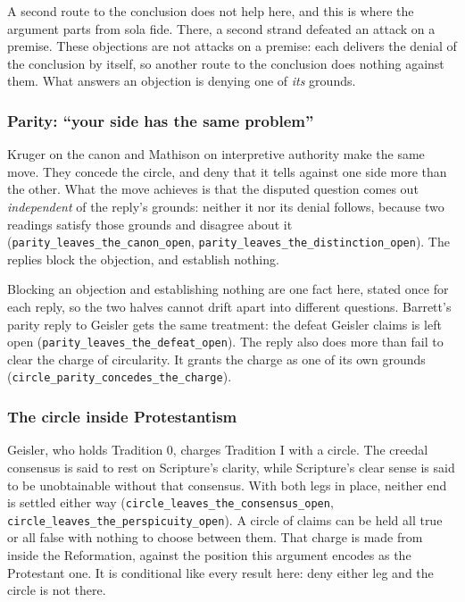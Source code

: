 \documentclass[11pt]{article}
\begin{document}
A second route to the conclusion does not help here, and this is where the argument parts from sola fide. There, a second strand defeated an attack on a premise. These objections are not attacks on a premise: each delivers the denial of the conclusion by itself, so another route to the conclusion does nothing against them. What answers an objection is denying one of \emph{its} grounds.

\subsubsection*{Parity: “your side has the same problem”}
Kruger on the canon and Mathison on interpretive authority make the same move. They concede the circle, and deny that it tells against one side more than the other. What the move achieves is that the disputed question comes out \emph{independent} of the reply’s grounds: neither it nor its denial follows, because two readings satisfy those grounds and disagree about it (\texttt{parity\_\allowbreak{}leaves\_\allowbreak{}the\_\allowbreak{}canon\_\allowbreak{}open}, \texttt{parity\_\allowbreak{}leaves\_\allowbreak{}the\_\allowbreak{}distinction\_\allowbreak{}open}). The replies block the objection, and establish nothing.

Blocking an objection and establishing nothing are one fact here, stated once for each reply, so the two halves cannot drift apart into different questions. Barrett’s parity reply to Geisler gets the same treatment: the defeat Geisler claims is left open (\texttt{parity\_\allowbreak{}leaves\_\allowbreak{}the\_\allowbreak{}defeat\_\allowbreak{}open}). The reply also does more than fail to clear the charge of circularity. It grants the charge as one of its own grounds (\texttt{circle\_\allowbreak{}parity\_\allowbreak{}concedes\_\allowbreak{}the\_\allowbreak{}charge}).

\subsubsection*{The circle inside Protestantism}
Geisler, who holds Tradition 0, charges Tradition I with a circle. The creedal consensus is said to rest on Scripture’s clarity, while Scripture’s clear sense is said to be unobtainable without that consensus. With both legs in place, neither end is settled either way (\texttt{circle\_\allowbreak{}leaves\_\allowbreak{}the\_\allowbreak{}consensus\_\allowbreak{}open}, \texttt{circle\_\allowbreak{}leaves\_\allowbreak{}the\_\allowbreak{}perspicuity\_\allowbreak{}open}). A circle of claims can be held all true or all false with nothing to choose between them. That charge is made from inside the Reformation, against the position this argument encodes as the Protestant one. It is conditional like every result here: deny either leg and the circle is not there.
\end{document}
